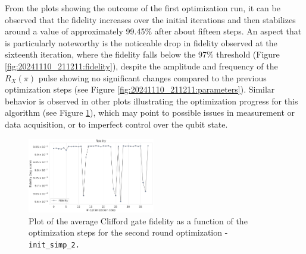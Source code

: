 From the plots showing the outcome of the first optimization run, it can be observed that the fidelity increases over the initial iterations and then stabilizes around a value of approximately 99.45\% after about fifteen steps.
An aspect that is particularly noteworthy is the noticeable drop in fidelity observed at the sixteenth iteration, where the fidelity falls below the 97\% threshold (Figure \ref{fig:20241110_211211:fidelity}), despite the amplitude and frequency of the $R_X(\pi)$ pulse showing no significant changes compared to the previous optimization steps (see Figure \ref{fig:20241110_211211:parameters}).
Similar behavior is observed in other plots illustrating the optimization progress for this algorithm (see Figure \ref{fig:20241113_181711:fidelity}), which may point to possible issues in measurement or data acquisition, or to imperfect control over the qubit state.

\begin{figure}[h!]
    \centering
    \includegraphics[width=0.495\textwidth]{figures/png/RB_optimization/NM/InitialSymplex/20241113_181711/fidelity.png}
    \caption{Plot of the average Clifford gate fidelity as a function of the optimization steps for the second round optimization - \tt{init\_simp\_2}.}
    \label{fig:20241113_181711:fidelity}
\end{figure}

